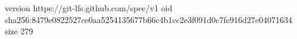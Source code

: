 version https://git-lfs.github.com/spec/v1
oid sha256:8479e0822527ce0aa5254135677b66c4b1cc2e3f091d0c7fe916d27e04071634
size 279
